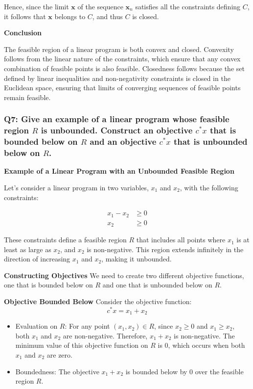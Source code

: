 \documentclass[8pt]{article}
\begin{document}
{Hence, since the limit \( \mathbf{x} \) of the sequence \( \mathbf{x}_n \) satisfies all the constraints defining \( C \), it follows that \( \mathbf{x} \) belongs to \( C \), and thus \( C \) is closed.

\textbf{Conclusion}

The feasible region of a linear program is both convex and closed. Convexity follows from the linear nature of the constraints, which ensure that any convex combination of feasible points is also feasible. Closedness follows because the set defined by linear inequalities and non-negativity constraints is closed in the Euclidean space, ensuring that limits of converging sequences of feasible points remain feasible.

\subsubsection*{Q7: Give an example of a linear program whose feasible region \(R\) is unbounded. Construct an objective \(c^* x\) that is bounded below on \(R\) and an objective \(c^* x\) that is unbounded below on \(R\).}

\textbf{Example of a Linear Program with an Unbounded Feasible Region}

Let's consider a linear program in two variables, \(x_1\) and \(x_2\), with the following constraints:

\begin{align*}
x_1 - x_2 &\geq 0 \\
x_2 &\geq 0
\end{align*}

These constraints define a feasible region \(R\) that includes all points where \(x_1\) is at least as large as \(x_2\), and \(x_2\) is non-negative. This region extends infinitely in the direction of increasing \(x_1\) and \(x_2\), making it unbounded.

\textbf{Constructing Objectives}
We need to create two different objective functions, one that is bounded below on \(R\) and one that is unbounded below on \(R\).

\textbf{Objective Bounded Below}
Consider the objective function:
\[
c^*x = x_1 + x_2
\]
\begin{itemize}
    \item Evaluation on \(R\): For any point \((x_1, x_2) \in R\), since \(x_2 \geq 0\) and \(x_1 \geq x_2\), both \(x_1\) and \(x_2\) are non-negative. Therefore, \(x_1 + x_2\) is non-negative. The minimum value of this objective function on \(R\) is \(0\), which occurs when both \(x_1\) and \(x_2\) are zero.
    \item Boundedness: The objective \(x_1 + x_2\) is bounded below by \(0\) over the feasible region \(R\).
\end{itemize}

}
\end{document}
